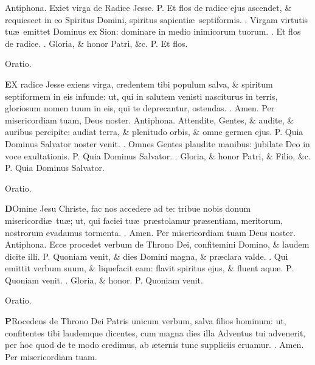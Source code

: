 \documentclass[letter,11pt]{book}
\makeatletter
\DeclareRobustCommand{\Vbar}{\vers@resp{-0.1em}{V}}
\DeclareRobustCommand{\Rbar}{\vers@resp{0pt}{R}}
\newcommand{\vers@resp@sym}{\raisebox{0.2ex}{\rotatebox[origin=c]{-20}{$\m@th\rceil$}}}
\newcommand{\vers@resp}[2]{%
  {\ooalign{\hidewidth\kern#1\vers@resp@sym\hidewidth\cr#2\cr}}%
}%
\def\P{\color{Red} P. \color{black}}
\def\V{\color{Red} \Vbar . \color{black}}
\def\R{\color{Red} \Rbar . \color{black}}
\makeatother
\begin{document}
\begin{multicols}{2}
\newline \color{Red} Antiphona. \color{black} Exiet virga de Radice Jesse. \P Et flos de radice ejus ascendet, \& requiescet in eo Spiritus Domini, spiritus sapienti\ae \ septiformis. \V Virgam virtutis tu\ae \ emittet Dominus ex Sion: dominare in medio inimicorum tuorum. \V Et flos de radice. \V Gloria, \& honor Patri, \&c. \P Et flos.
\vspace{-.5em} \begin{center} \color{Red} Oratio. \color{black} \end{center} \vspace{-.5em}
\lettrine[lines=2]{\bfseries \color{Red} E}{}X radice Jesse exiens virga, credentem tibi populum salva, \& spiritum septiformem in eis infunde: ut, qui in salutem venisti nasciturus in terris, gloriosum nomen tuum in eis, qui te deprecantur, ostendas. \R Amen. Per misericordiam tuam, Deus noster.
\newline \color{Red} Antiphona. \color{black} Attendite, Gentes, \& audite, \& auribus percipite: audiat terra, \& plenitudo orbis, \& omne germen ejus. \P Quia Dominus Salvator noster venit. \V Omnes Gentes plaudite manibus: jubilate Deo in voce exultationis. \P Quia Dominus Salvator. \V Gloria, \& honor Patri, \& Filio, \&c. \P Quia Dominus Salvator.
\vspace{-.5em} \begin{center} \color{Red} Oratio. \color{black} \end{center} \vspace{-.5em}
\lettrine[lines=2]{\bfseries \color{Red} D}{}Omine Jesu Christe, fac nos accedere ad te: tribue nobis donum misericordi\ae \ tu\ae ; ut, qui faciei tu\ae \ pr\ae stolamur pr\ae sentiam, meritorum, nostrorum evadamus tormenta. \R Amen. Per misericordiam tuam Deus noster.
\newline \color{Red} Antiphona. \color{black} Ecce procedet verbum de Throno Dei, confitemini Domino, \& laudem dicite illi. \P Quoniam venit, \& dies Domini magna, \& pr\ae clara valde. \V Qui emittit verbum suum, \& liquefacit eam: flavit spiritus ejus, \& fluent aqu\ae . \P Quoniam venit. \V Gloria, \& honor. \P Quoniam venit.
\vspace{-.5em} \begin{center} \color{Red} Oratio. \color{black} \end{center} \vspace{-.5em}
\lettrine[lines=2]{\bfseries \color{Red} P}{}Rocedens de Throno Dei Patris unicum verbum, salva filios hominum: ut, confitentes tibi laudemque dicentes, cum magna dies illa Adventus tui advenerit, per hoc quod de te modo credimus, ab \ae ternis tunc suppliciis eruamur. \R Amen. Per misericordiam tuam.

\end{multicols}
\end{document}

